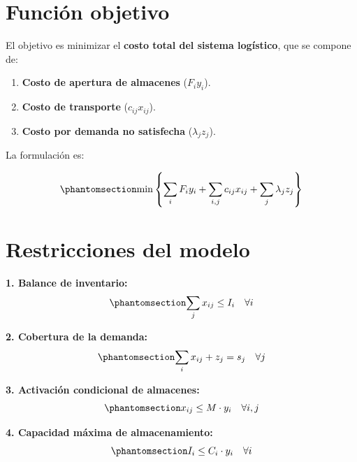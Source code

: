 \documentclass[
  spanish,
  us-letterpaper,
]{scrreprt}
\providecommand{\tightlist}{%
  \setlength{\itemsep}{0pt}\setlength{\parskip}{0pt}}
\numberwithin{equation}{section}
\begin{document}
\section{Función objetivo}\label{funciuxf3n-objetivo}

El objetivo es minimizar el \textbf{costo total del sistema logístico},
que se compone de:

\begin{enumerate}
\def\labelenumi{\arabic{enumi}.}
\tightlist
\item
  \textbf{Costo de apertura de almacenes} (\(F_i y_i\)).\\
\item
  \textbf{Costo de transporte} (\(c_{ij} x_{ij}\)).\\
\item
  \textbf{Costo por demanda no satisfecha} (\(\lambda_j z_j\)).
\end{enumerate}

La formulación es:

\begin{equation}\phantomsection\label{eq-PBHE_completa}{
\min \left\{ \sum_{i} F_i y_i + \sum_{i,j} c_{ij} x_{ij} + \sum_j \lambda_j z_j \right\} 
}\end{equation}

\section{Restricciones del modelo}\label{restricciones-del-modelo}

\textbf{1. Balance de inventario:}
\begin{equation}\phantomsection\label{eq-1b}{
\sum_j x_{ij} \leq I_i \quad \forall i 
}\end{equation}

\textbf{2. Cobertura de la demanda:}
\begin{equation}\phantomsection\label{eq-2c}{
\sum_i x_{ij} + z_j = s_j \quad \forall j 
}\end{equation}

\textbf{3. Activación condicional de almacenes:}
\begin{equation}\phantomsection\label{eq-3a}{
x_{ij} \leq M \cdot y_i \quad \forall i,j 
}\end{equation}

\textbf{4. Capacidad máxima de almacenamiento:}
\begin{equation}\phantomsection\label{eq-4c}{
I_i \leq C_i \cdot y_i \quad \forall i 
}\end{equation}
\end{document}
